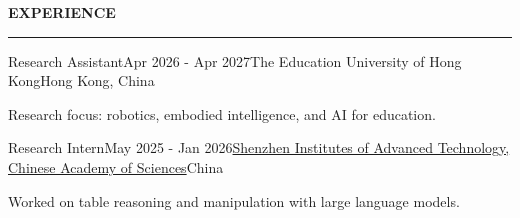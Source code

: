 \documentclass{resume} %
\renewenvironment{rSection}[1]{
  \sectionskip
  \textbf{\MakeUppercase{#1}}
  \sectionlineskip
  \hrule
  \begin{list}{}{
  \setlength{\leftmargin}{1.5em}
  }
  \item[]
  }{
  \end{list}
  }
\begin{document}
  \begin{rSection}{Experience}

  \begin{rSubsection}{Research Assistant}{Apr 2026 - Apr 2027}{The Education University of Hong
  Kong}{Hong Kong, China}
  \item Research focus: robotics, embodied intelligence, and AI for education.
  \end{rSubsection}

  \begin{rSubsection}{Research Intern}{May 2025 - Jan 2026}{\href{http://english.siat.cas.cn/}
  {Shenzhen Institutes of Advanced Technology, Chinese Academy of Sciences}}{China}
  \item Worked on table reasoning and manipulation with large language models.
  \end{rSubsection}

  \end{rSection}

  
\end{document}
